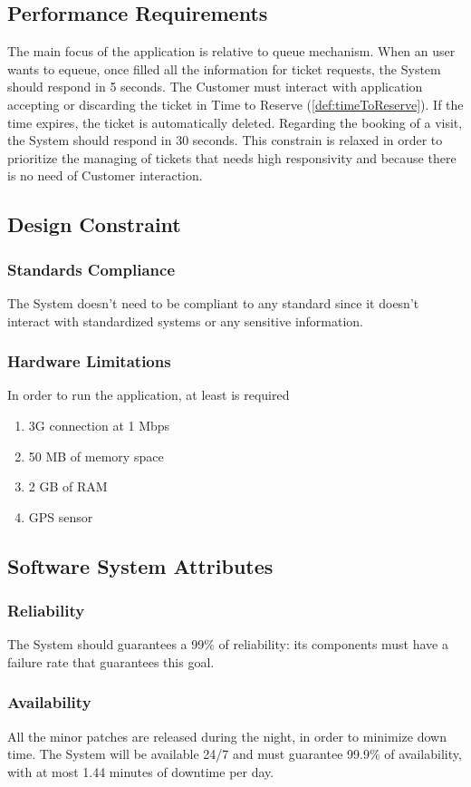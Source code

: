 \documentclass[a4paper, 12pt, oneside]{article}
\begin{document}
\subsection{Performance Requirements}
The main focus of the application is relative to queue mechanism.
When an user wants to equeue, once filled all the information for ticket requests, the System should respond in 5 seconds. The Customer must interact with application accepting or discarding the ticket in Time to Reserve  (\ref{def:timeToReserve}). If the time expires, the ticket is automatically deleted.
Regarding the booking of a visit, the System should respond in 30 seconds. This constrain is relaxed in order to prioritize the managing of tickets that needs high responsivity and because there is no need of Customer interaction.

\subsection{Design Constraint}
\subsubsection{Standards Compliance}
The System doesn't need to be compliant to any standard since it doesn't interact with standardized systems or any sensitive information.
\subsubsection{Hardware Limitations}
In order to run the application, at least is required
\begin{enumerate}
    \item 3G connection at 1 Mbps
    \item 50 MB of memory space
    \item 2 GB of RAM
    \item GPS sensor
\end{enumerate}

\subsection{Software System Attributes}
\subsubsection{Reliability}
The System should guarantees a 99\% of reliability: its components must have
a failure rate that guarantees this goal. 
\subsubsection{Availability}
All the minor patches are released during the night, in order to minimize down time.
The System will be available 24/7 and must guarantee 99.9\% of availability, with at most 1.44 minutes of downtime per day.  
\end{document}
